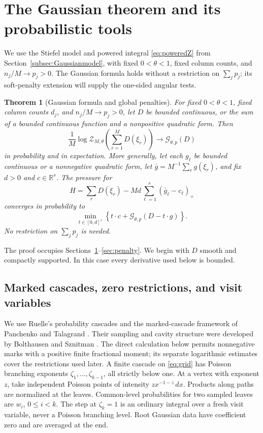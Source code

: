 \documentclass[11pt]{article}
\numberwithin{equation}{section}
\newtheorem{theorem}{Theorem}[section]
\theoremstyle{definition}
\newcommand{\R}{\mathbb R}
\newcommand{\Gauss}{\mathcal G}
\newcommand{\calZ}{\mathcal Z}
\begin{document}
\section{The Gaussian theorem and its probabilistic tools}
\label{sec:Gaussian}
We use the Stiefel model and powered integral \eqref{eq:poweredZ} from Section~\ref{subsec:Gaussianmodel}, with fixed $0<\theta<1$, fixed column counts, and $n_j/M\to p_j>0$. The Gaussian formula holds without a restriction on $\sum_jp_j$; its soft-penalty extension will supply the one-sided angular tests.

\begin{theorem}[Gaussian formula and global penalties]\label{thm:Gaussian}
For fixed $0<\theta<1$, fixed column counts $d_j$, and $n_j/M\to p_j>0$, let $D$ be bounded continuous, or the sum of a bounded continuous function and a nonpositive quadratic form. Then
\begin{equation}\label{eq:Gaussianlimit}
\frac1M\log\calZ_{M,\theta}\left(\sum_{r=1}^M D(\xi_r)\right)
\longrightarrow\Gauss_{\theta,p}(D)
\end{equation}
in probability and in expectation. More generally, let each $g_\ell$ be bounded continuous or a nonnegative quadratic form, let $\bar g=M^{-1}\sum_r g(\xi_r)$, and fix $d>0$ and $c\in\R^s$. The pressure for
\[
H=\sum_rD(\xi_r)-Md\sum_{\ell=1}^s(\bar g_\ell-c_\ell)_+
\]
converges in probability to
\begin{equation}\label{eq:softduality}
\min_{t\in[0,d]^s}\left\{t\cdot c+\Gauss_{\theta,p}(D-t\cdot g)\right\}.
\end{equation}
No restriction on $\sum_jp_j$ is needed.
\end{theorem}

The proof occupies Sections~\ref{sec:Gaussian}--\ref{sec:penalty}. We begin with $D$ smooth and compactly supported. In this case every derivative used below is bounded.

\subsection{Marked cascades, zero restrictions, and visit variables}
We use Ruelle's probability cascades \cite{Ruelle1987} and the marked-cascade framework of Panchenko and Talagrand \cite{PT}. Their sampling and cavity structure were developed by Bolthausen and Sznitman \cite{BolthausenSznitman1998}. The direct calculation below permits nonnegative marks with a positive finite fractional moment; its separate logarithmic estimates cover the restrictions used later.
A finite cascade on \eqref{eq:grid} has Poisson branching exponents $\zeta_1,\ldots,\zeta_{k-1}$, all strictly below one. At a vertex with exponent $z$, take independent Poisson points of intensity $z x^{-1-z}\,dx$. Products along paths are normalized at the leaves. Common-level probabilities for two sampled leaves are $w_i$, $0\le i<k$. The step at $\zeta_k=1$ is an ordinary integral over a fresh visit variable, never a Poisson branching level. Root Gaussian data have coefficient zero and are averaged at the end.
\end{document}
